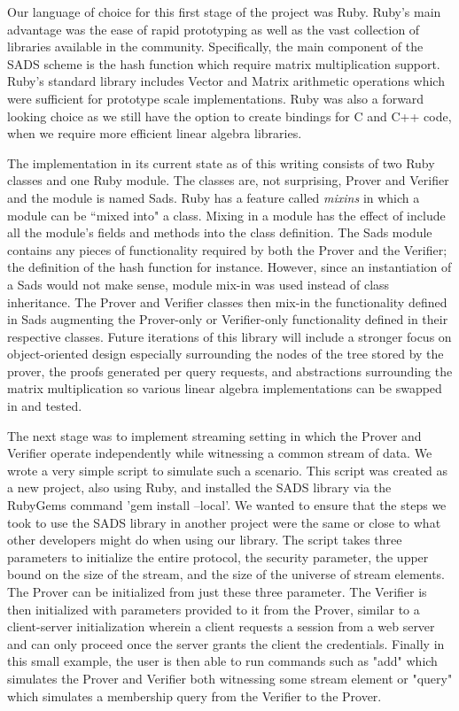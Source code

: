 \documentclass[11pt, letterpaper, oneside]{article}
\begin{document}
	Our language of choice for this first stage of the project was Ruby.
	Ruby's main advantage was the ease of rapid prototyping as well as the vast collection of libraries available in the community.
	Specifically, the main component of the SADS scheme is the hash function which require matrix multiplication support.
	Ruby's standard library includes Vector and Matrix arithmetic operations which were sufficient for prototype scale implementations.
	Ruby was also a forward looking choice as we still have the option to create bindings for C and C++ code, when we require more efficient linear algebra libraries.

	The implementation in its current state as of this writing consists of two Ruby classes and one Ruby module.
	The classes are, not surprising, Prover and Verifier and the module is named Sads.
	Ruby has a feature called \textit{mixins} in which a module can be ``mixed into" a class.
	Mixing in a module has the effect of include all the module's fields and methods into the class definition.
	The Sads module contains any pieces of functionality required by both the Prover and the Verifier; the definition of the hash function for instance.
	However, since an instantiation of a Sads would not make sense, module mix-in was used instead of class inheritance.
	The Prover and Verifier classes then mix-in the functionality defined in Sads augmenting the Prover-only or Verifier-only functionality defined in their respective classes.
		Future iterations of this library will include a stronger focus on object-oriented design especially surrounding the nodes of the tree stored by the prover, the proofs generated per query requests, and abstractions surrounding the matrix multiplication so various linear algebra implementations can be swapped in and tested.

	The next stage was to implement streaming setting in which the Prover and Verifier operate independently while witnessing a common stream of data.
	We wrote a very simple script to simulate such a scenario.
	This script was created as a new project, also using Ruby, and installed the SADS library via the RubyGems command 'gem install --local'.
	We wanted to ensure that the steps we took to use the SADS library in another project were the same or close to what other developers might do when using our library.
	The script takes three parameters to initialize the entire protocol, the security parameter, the upper bound on the size of the stream, and the size of the universe of stream elements.
	The Prover can be initialized from just these three parameter.
	The Verifier is then initialized with parameters provided to it from the Prover, similar to a client-server initialization wherein a client requests a session from a web server and can only proceed once the server grants the client the credentials.
	Finally in this small example, the user is then able to run commands such as "add" which simulates the Prover and Verifier both witnessing some stream element or "query" which simulates a membership query from the Verifier to the Prover.
\end{document}
